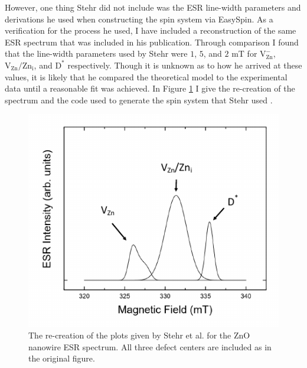 \documentclass[oneside, noacknowlegments]{BYUPhys}
\begin{document}
However, one thing Stehr did not include was the ESR line-width parameters and derivations he used when constructing the spin system via EasySpin. As a verification for the process he used, I have included a reconstruction of the same ESR spectrum that was included in his publication. Through comparison I found that the line-width parameters used by Stehr were $1$, $5$, and $2$ mT for 
$\text{V}_{\text{Zn}}^{-}$, $\text{V}_{\text{Zn}}/\text{Zn}_{\text{i}}$, and $\text{D}^{*}$ respectively. Though it is unknown as to how he arrived at these values, it is likely that he compared the theoretical model to the experimental data until a reasonable fit was achieved. In Figure \ref{fig:StehrRec} I give the re-creation of the spectrum and the code used to generate the spin system that Stehr used \cite{RefWorks:doc:58929128e4b0228a292928a7}.


\begin{figure}
    \centerline{\includegraphics{stehr_rec_fig}}
    \caption[Recreation of ZnO Nanowire ESR]{\label{fig:StehrRec}
     The re-creation of the plots given by Stehr et al. for the ZnO nanowire ESR spectrum. All three defect centers are included as in the original figure. }
 \end{figure}
\end{document}
